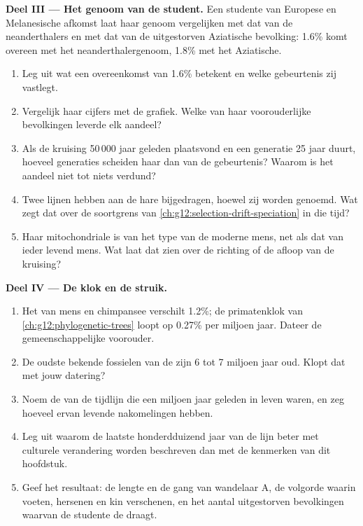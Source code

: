 \begin{problem}
\medskip
\noindent\textbf{Deel III --- Het genoom van de student.}
Een studente van Europese en Melanesische afkomst laat haar genoom
vergelijken met dat van de neanderthalers en met dat van de uitgestorven
Aziatische bevolking: 1.6\% komt overeen met het neanderthalergenoom,
1.8\% met het Aziatische.
\begin{enumerate}[resume]
  \item Leg uit wat een overeenkomst van 1.6\% betekent en welke
        gebeurtenis zij vastlegt.
  \item Vergelijk haar cijfers met de grafiek. Welke van haar
        voorouderlijke bevolkingen leverde elk aandeel?
  \item Als de kruising 50\,000 jaar geleden plaatsvond en een generatie
        25 jaar duurt, hoeveel generaties scheiden haar dan van de
        gebeurtenis? Waarom is het aandeel niet tot niets verdund?
  \item Twee lijnen hebben  aan de hare bijgedragen, hoewel zij
         worden genoemd. Wat zegt dat over de soortgrens van
        \cref{ch:g12:selection-drift-speciation} in die tijd?
  \item Haar mitochondriale  is van het type van de moderne mens, net
        als dat van ieder levend mens. Wat laat dat zien over de richting
        of de afloop van de kruising?
\end{enumerate}

\medskip
\noindent\textbf{Deel IV --- De klok en de struik.}
\begin{enumerate}[resume]
  \item Het  van mens en chimpansee verschilt 1.2\%; de primatenklok
        van \cref{ch:g12:phylogenetic-trees} loopt op 0.27\% per miljoen
        jaar. Dateer de gemeenschappelijke voorouder.
  \item De oudste bekende fossielen van de  zijn 6 tot 7
        miljoen jaar oud. Klopt dat met jouw datering?
  \item Noem de  van de tijdlijn die een miljoen jaar geleden in
        leven waren, en zeg hoeveel ervan levende nakomelingen hebben.
  \item Leg uit waarom de laatste honderdduizend jaar van de lijn beter
        met culturele verandering worden beschreven dan met de kenmerken
        van dit hoofdstuk.
  \item Geef het resultaat: de lengte en de gang van wandelaar A, de
        volgorde waarin voeten, hersenen en kin verschenen, en het aantal
        uitgestorven bevolkingen waarvan de studente de  draagt.
\end{enumerate}
\end{problem}
